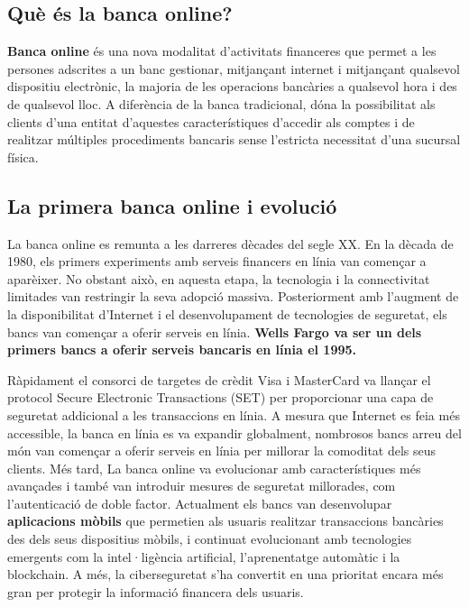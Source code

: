 
\subsection*{Què és la banca online?}


\textbf{Banca online} és una nova modalitat d'activitats financeres que permet a les persones adscrites a un banc gestionar, mitjançant internet i mitjançant qualsevol dispositiu electrònic, la majoria de les operacions bancàries a qualsevol hora i des de qualsevol lloc. A diferència de la banca tradicional, dóna la possibilitat als clients d'una entitat d'aquestes característiques d'accedir als comptes i de realitzar múltiples procediments bancaris sense l'estricta necessitat d'una sucursal física. 


\subsection*{La primera banca online i evolució}

La banca online es remunta a les darreres dècades del segle XX. En la dècada de 1980, els primers experiments amb serveis financers en línia van començar a aparèixer. No obstant això, en aquesta etapa, la tecnologia i la connectivitat limitades van restringir la seva adopció massiva. Posteriorment amb l'augment de la disponibilitat d'Internet i el desenvolupament de tecnologies de seguretat, els bancs van començar a oferir serveis en línia. \textbf{Wells Fargo va ser un dels primers bancs a oferir serveis bancaris en línia el 1995.}

Ràpidament el consorci de targetes de crèdit Visa i MasterCard va llançar el protocol Secure Electronic Transactions (SET) per proporcionar una capa de seguretat addicional a les transaccions en línia. A mesura que Internet es feia més accessible, la banca en línia es va expandir globalment, nombrosos bancs arreu del món van començar a oferir serveis en línia per millorar la comoditat dels seus clients. Més tard, La banca online va evolucionar amb característiques més avançades i  també van introduir mesures de seguretat millorades, com l'autenticació de doble factor. Actualment els bancs van desenvolupar \textbf{aplicacions mòbils} que permetien als usuaris realitzar transaccions bancàries des dels seus dispositius mòbils, i  continuat evolucionant amb tecnologies emergents com la intel·ligència artificial, l'aprenentatge automàtic i la blockchain. A més, la ciberseguretat s'ha convertit en una prioritat encara més gran per protegir la informació financera dels usuaris.


